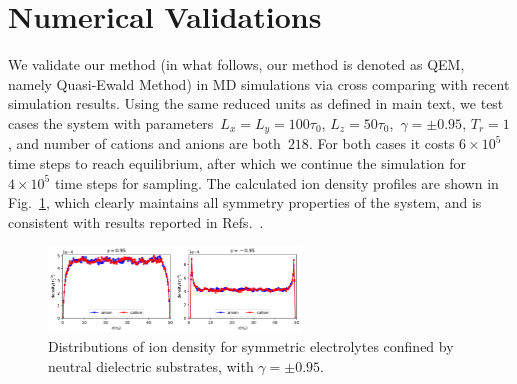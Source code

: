 \documentclass[aps,prl,reprint,showpacs,floatfix,superscriptaddress, onecolumn]{revtex4-2}
\begin{document}
\section{Numerical Validations}


We validate our method (in what follows, our method is denoted as QEM, namely Quasi-Ewald Method) in MD simulations via cross comparing with recent simulation results.
Using the same reduced units as defined in main text, we test cases the system with parameters~$L_x = L_y = 100 \tau_0$, $L_z = 50 \tau_0$,~$\gamma = \pm 0.95$, $T_r=1$, and number of cations and anions are both~$218$.
For both cases it costs $6 \times 10^5$ time steps to reach equilibrium, after which we continue the simulation for $4 \times 10^5$ time steps for sampling.
The calculated ion density profiles are shown in Fig.~\ref{fig:QEM_HSMA}, which clearly maintains all symmetry properties of the system, and is consistent with results reported in Refs.~\cite{liang2020harmonic,yuan2021particle}.
\begin{figure}[htbp]
	\centering
	\includegraphics[width=0.6\textwidth]{SIfig/MD_simple.pdf}
	\caption{
	Distributions of ion density for symmetric electrolytes confined by neutral dielectric substrates, with $\gamma = \pm 0.95$.
		\label{fig:QEM_HSMA}
	}
\end{figure}
\end{document}
